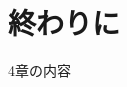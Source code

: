\documentclass[main]{subfiles}
\begin{document}
\section{終わりに}
4章の内容
\\
\\
\\
\\
\\
\\
\\
\\
\end{document}
